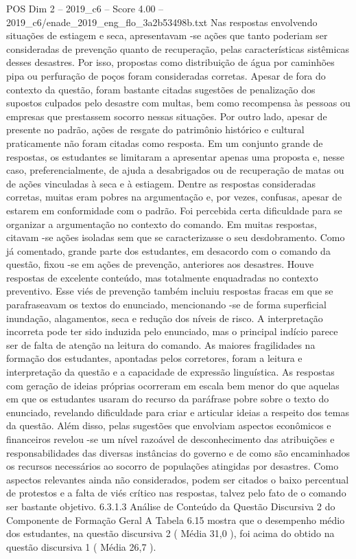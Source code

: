 \begin{textsample}{POS Dim 2 – 2019\_c6 – Score 4.00 – 2019\_c6/enade\_2019\_eng\_flo\_3a2b53498b.txt}
Nas respostas envolvendo situações de estiagem e seca, apresentavam -se ações que tanto poderiam ser consideradas de prevenção quanto de recuperação, pelas características sistêmicas desses desastres.
Por isso, propostas como distribuição de água por caminhões pipa ou perfuração de poços foram consideradas corretas.
Apesar de fora do contexto da questão, foram bastante citadas sugestões de penalização dos supostos culpados pelo desastre com multas, bem como recompensa às pessoas ou empresas que prestassem socorro nessas situações.
Por outro lado, apesar de presente no padrão, ações de resgate do patrimônio histórico e cultural praticamente não foram citadas como resposta.
Em um conjunto grande de respostas, os estudantes se limitaram a apresentar apenas uma proposta e, nesse caso, preferencialmente, de ajuda a desabrigados ou de recuperação de matas ou de ações vinculadas à seca e à estiagem.
Dentre as respostas consideradas corretas, muitas eram pobres na argumentação e, por vezes, confusas, apesar de estarem em conformidade com o padrão.
Foi percebida certa dificuldade para se organizar a argumentação no contexto do comando.
Em muitas respostas, citavam -se ações isoladas sem que se caracterizasse o seu desdobramento.
Como já comentado, grande parte dos estudantes, em desacordo com o comando da questão, fixou -se em ações de prevenção, anteriores aos desastres.
Houve respostas de excelente conteúdo, mas totalmente enquadradas no contexto preventivo.
Esse viés de prevenção também incluiu respostas fracas em que se parafraseavam os textos do enunciado, mencionando -se de forma superficial inundação, alagamentos, seca e redução dos níveis de risco.
A interpretação incorreta pode ter sido induzida pelo enunciado, mas o principal indício parece ser de falta de atenção na leitura do comando.
As maiores fragilidades na formação dos estudantes, apontadas pelos corretores, foram a leitura e interpretação da questão e a capacidade de expressão linguística.
As respostas com geração de ideias próprias ocorreram em escala bem menor do que aquelas em que os estudantes usaram do recurso da paráfrase pobre sobre o texto do enunciado, revelando dificuldade para criar e articular ideias a respeito dos temas da questão.
Além disso, pelas sugestões que envolviam aspectos econômicos e financeiros revelou -se um nível razoável de desconhecimento das atribuições e responsabilidades das diversas instâncias do governo e de como são encaminhados os recursos necessários ao socorro de populações atingidas por desastres.
Como aspectos relevantes ainda não considerados, podem ser citados o baixo percentual de protestos e a falta de viés crítico nas respostas, talvez pelo fato de o comando ser bastante objetivo. 6.3.1.3 Análise de Conteúdo da Questão Discursiva 2 do Componente de Formação Geral A Tabela 6.15 mostra que o desempenho médio dos estudantes, na questão discursiva 2 ( Média 31,0 ), foi acima do obtido na questão discursiva 1 ( Média 26,7 ).

\end{textsample}
